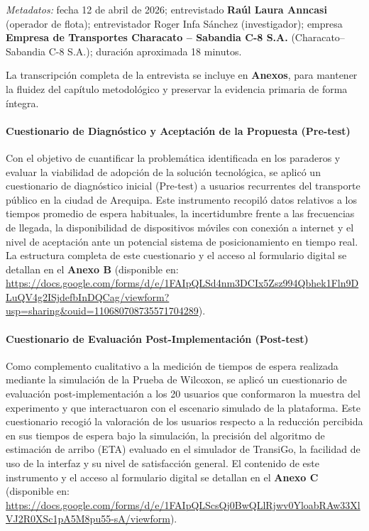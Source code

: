 \textit{Metadatos:} fecha 12 de abril de 2026; entrevistado \textbf{Raúl Laura Anncasi} (operador de flota); entrevistador Roger Infa Sánchez (investigador); empresa \textbf{Empresa de Transportes Characato -- Sabandia C-8 S.A.} (Characato--Sabandia C-8 S.A.); duración aproximada 18 minutos.

La transcripción completa de la entrevista se incluye en \textbf{Anexos}, para mantener la fluidez del capítulo metodológico y preservar la evidencia primaria de forma íntegra.

\paragraph{Cuestionario de Diagnóstico y Aceptación de la Propuesta (Pre-test)}

Con el objetivo de cuantificar la problemática identificada en los paraderos y evaluar la viabilidad de adopción de la solución tecnológica, se aplicó un cuestionario de diagnóstico inicial (Pre-test) a usuarios recurrentes del transporte público en la ciudad de Arequipa. Este instrumento recopiló datos relativos a los tiempos promedio de espera habituales, la incertidumbre frente a las frecuencias de llegada, la disponibilidad de dispositivos móviles con conexión a internet y el nivel de aceptación ante un potencial sistema de posicionamiento en tiempo real. La estructura completa de este cuestionario y el acceso al formulario digital se detallan en el \textbf{Anexo B} (disponible en: \url{https://docs.google.com/forms/d/e/1FAIpQLSd4nm3DCIx5Zsz994Qbhek1Fln9DLuQV4g2ISjdefbInDQCag/viewform?usp=sharing&ouid=110680708735571704289}).

\paragraph{Cuestionario de Evaluación Post-Implementación (Post-test)}

Como complemento cualitativo a la medición de tiempos de espera realizada mediante la simulación de la Prueba de Wilcoxon, se aplicó un cuestionario de evaluación post-implementación a los 20 usuarios que conformaron la muestra del experimento y que interactuaron con el escenario simulado de la plataforma. Este cuestionario recogió la valoración de los usuarios respecto a la reducción percibida en sus tiempos de espera bajo la simulación, la precisión del algoritmo de estimación de arribo (ETA) evaluado en el simulador de TransiGo, la facilidad de uso de la interfaz y su nivel de satisfacción general. El contenido de este instrumento y el acceso al formulario digital se detallan en el \textbf{Anexo C} (disponible en: \url{https://docs.google.com/forms/d/e/1FAIpQLScsQj0BwQLlRjwv0YloabRAw33XlVJ2R0XSc1pA5M8pu55-sA/viewform}).

